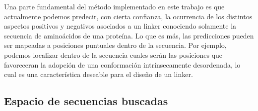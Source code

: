 
Una parte fundamental del método implementado en este trabajo es que actualmente podemos predecir, con cierta confianza, 
la ocurrencia de los distintos aspectos positivos y negativos asociados a un linker conociendo solamente la secuencia de aminoácidos de una proteína.
Lo que es más, las predicciones pueden ser mapeadas a posiciones puntuales dentro de la secuencia. 
Por ejemplo, podemos localizar dentro de la secuencia cuales serán las posiciones 
que favoreceran la adopción de una conformación intrínsecamente desordenada, lo cual es una característica deseable para el diseño de un linker.







\subsection{Espacio de secuencias buscadas}\label{espacioSecuencial}


